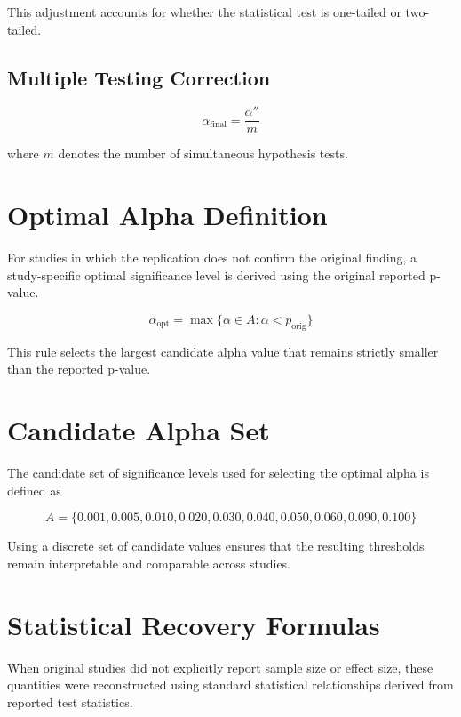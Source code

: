 This adjustment accounts for whether the statistical test is
one-tailed or two-tailed.

\subsection{Multiple Testing Correction}

\begin{equation}
	\alpha_{\text{final}} = \frac{\alpha''}{m}
\end{equation}

where $m$ denotes the number of simultaneous hypothesis tests.

\section{Optimal Alpha Definition}

For studies in which the replication does not confirm the original
finding, a study-specific optimal significance level is derived using
the original reported p-value.

\begin{equation}
	\alpha_{\text{opt}} =
	\max \{\alpha \in A : \alpha < p_{\text{orig}}\}
\end{equation}

This rule selects the largest candidate alpha value that remains
strictly smaller than the reported p-value.

\section{Candidate Alpha Set}

The candidate set of significance levels used for selecting the
optimal alpha is defined as

\begin{equation}
	A =
	\{0.001,0.005,0.010,0.020,0.030,0.040,0.050,0.060,0.090,0.100\}
\end{equation}

Using a discrete set of candidate values ensures that the resulting
thresholds remain interpretable and comparable across studies.

\section{Statistical Recovery Formulas}

When original studies did not explicitly report sample size or effect
size, these quantities were reconstructed using standard statistical
relationships derived from reported test statistics.

